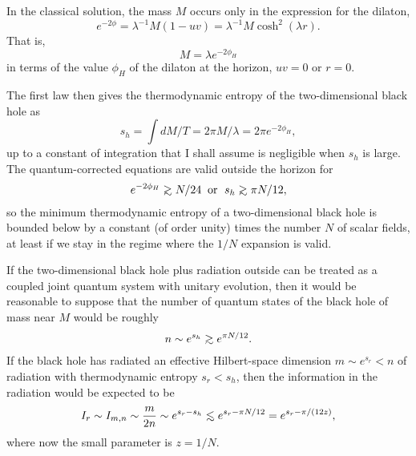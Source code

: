 \baselineskip 15.1pt
	In the classical solution, the mass $M$ occurs only
in the expression for the dilaton,
	\begin{equation}
	e^{-2\phi}=\lambda^{-1}M(1-uv)
	=\lambda^{-1}M\cosh^2(\lambda r).
	\end{equation}
That is,
	\begin{equation}
	M=\lambda e^{-2\phi_H}
	\end{equation}
in terms of the value $\phi_H$ of the dilaton at the horizon,
$uv=0$ or $r=0$.

	The first law then gives the thermodynamic entropy
of the two-dimensional black hole as
	\begin{equation}
	s_h=\int dM/T=2\pi M/\lambda=2\pi e^{-2\phi_H},
	\end{equation}
up to a constant of integration that I shall assume is
negligible when $s_h$ is large.  The quantum-corrected
equations \cite{CGHS} are valid outside the horizon for
	\begin{equation}
	e^{-2\phi_H}
	{\;\raise.3ex\hbox{$>$\kern-.75em\lower1ex\hbox{$\sim$}}\;}
	N/24\;\;
	\mbox{\rm or }\;s_h
	{\;\raise.3ex\hbox{$>$\kern-.75em\lower1ex\hbox{$\sim$}}\;}
	\pi N/12,
	\end{equation}
so the minimum thermodynamic entropy of a
two-dimensional black hole is bounded below by a
constant (of order unity) times the number $N$ of scalar fields,
at least if we stay in the regime where the $1/N$ expansion
is valid.

	If the two-dimensional black hole plus radiation
outside can be treated as a coupled joint quantum
system with unitary evolution, then it would be reasonable
to suppose that the number of quantum states of the
black hole of mass near $M$ would be roughly
	\begin{equation}
	n\sim e^{s_h}
	{\;\raise.3ex\hbox{$>$\kern-.75em\lower1ex\hbox{$\sim$}}\;}
	e^{\pi N/12}.
	\end{equation}
If the black hole has radiated an effective Hilbert-space
dimension $m\sim e^{s_r}<n$ of radiation with
thermodynamic entropy $s_r<s_h$, then the information
in the radiation would be expected to be
	\begin{equation}
	I_r\sim I_{m,n}\sim\frac{m}{2n}\sim e^{s_r-s_h}
	{\;\raise.3ex\hbox{$<$\kern-.75em\lower1ex\hbox{$\sim$}}\;}
	e^{s_r-\pi N/12}=e^{s_r-\pi/(12z)},
	\end{equation}
where now the small parameter is $z=1/N$.

